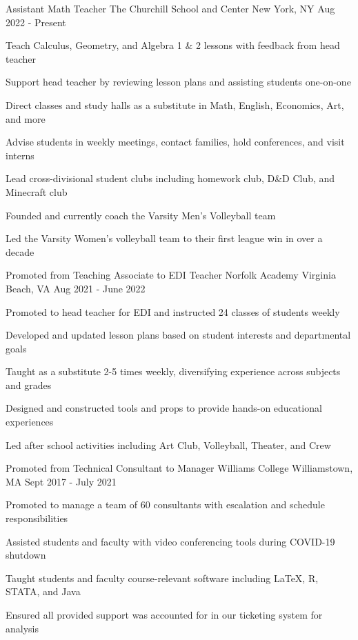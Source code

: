 \begin{cventries}
  \cventry
  {Assistant Math Teacher}
  {The Churchill School and Center}
  {New York, NY}
  {Aug 2022 - Present}
  {
    \begin{cvitems}
      \item {Teach Calculus, Geometry, and Algebra 1 \& 2 lessons with feedback from head teacher}
      \item {Support head teacher by reviewing lesson plans and assisting students one-on-one}
      \item {Direct classes and study halls as a substitute in Math, English, Economics, Art, and more}
      \item {Advise students in weekly meetings, contact families, hold conferences, and visit interns}
      \item {Lead cross-divisional student clubs including homework club, D\&D Club, and Minecraft club}
      \item {Founded and currently coach the Varsity Men's Volleyball team}
      \item {Led the Varsity Women's volleyball team to their first league win in over a decade}
    \end{cvitems}
  }

  \cventry
  {Promoted from Teaching Associate to EDI Teacher}
  {Norfolk Academy}
  {Virginia Beach, VA}
  {Aug 2021 - June 2022}
  {
    \begin{cvitems}
      \item {Promoted to head teacher for EDI and instructed 24 classes of students weekly}
      \item {Developed and updated lesson plans based on student interests and departmental goals}
      \item {Taught as a substitute 2-5 times weekly, diversifying experience across subjects and grades}
      \item {Designed and constructed tools and props to provide hands-on educational experiences}
      \item {Led after school activities including Art Club, Volleyball, Theater, and Crew}
    \end{cvitems}
  }

  \cventry
  {Promoted from Technical Consultant to Manager}
  {Williams College}
  {Williamstown, MA}
  {Sept 2017 - July 2021}
  {
    \begin{cvitems}
      \item {Promoted to manage a team of 60 consultants with escalation and schedule responsibilities}
      \item {Assisted students and faculty with video conferencing tools during COVID-19 shutdown}
      \item {Taught students and faculty course-relevant software including LaTeX, R, STATA, and Java}
      \item {Ensured all provided support was accounted for in our ticketing system for analysis}
    \end{cvitems}
  }


\end{cventries}
